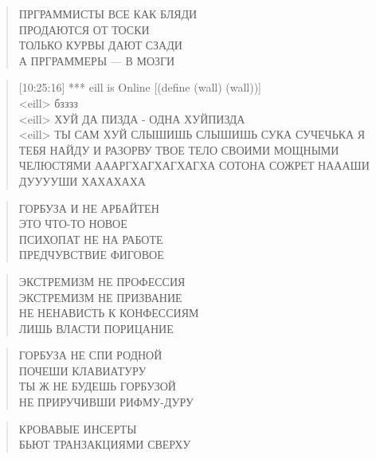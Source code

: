 \poemtitle{***}
\begin{verse}
ПРГРАММИСТЫ ВСЕ КАК БЛЯДИ\\
ПРОДАЮТСЯ ОТ ТОСКИ\\
ТОЛЬКО КУРВЫ ДАЮТ СЗАДИ\\
А ПРГРАММЕРЫ — В МОЗГИ
\end{verse}

\poemtitle{***}
\begin{verse}
[10:25:16] *** eill is Online [(define (wall) (wall))]\\
[10:25:18] <eill> бзззз\\
[10:25:27] <eill> ХУЙ ДА ПИЗДА - ОДНА ХУЙПИЗДА\\
[10:26:12] <eill> ТЫ САМ ХУЙ СЛЫШИШЬ СЛЫШИШЬ СУКА СУЧЕЧЬКА Я ТЕБЯ НАЙДУ И РАЗОРВУ ТВОЕ ТЕЛО СВОИМИ МОЩНЫМИ ЧЕЛЮСТЯМИ АААРГХАГХАГХАГХА СОТОНА СОЖРЕТ НАААШИ ДУУУУШИ ХАХАХАХА
\end{verse}

\poemtitle{***}
\begin{verse}
ГОРБУЗА И НЕ АРБАЙТЕН\\
ЭТО ЧТО-ТО НОВОЕ\\
ПСИХОПАТ НЕ НА РАБОТЕ\\
ПРЕДЧУВСТВИЕ ФИГОВОЕ
\end{verse}

\poemtitle{***}
\begin{verse}
ЭКСТРЕМИЗМ НЕ ПРОФЕССИЯ\\
ЭКСТРЕМИЗМ НЕ ПРИЗВАНИЕ\\
НЕ НЕНАВИСТЬ К КОНФЕССИЯМ\\
ЛИШЬ ВЛАСТИ ПОРИЦАНИЕ
\end{verse}

\poemtitle{***}
\begin{verse}
ГОРБУЗА НЕ СПИ РОДНОЙ\\
ПОЧЕШИ КЛАВИАТУРУ\\
ТЫ Ж НЕ БУДЕШЬ ГОРБУЗОЙ\\
НЕ ПРИРУЧИВШИ РИФМУ-ДУРУ
\end{verse}

\poemtitle{***}
\begin{verse}
КРОВАВЫЕ ИНСЕРТЫ\\
БЬЮТ ТРАНЗАКЦИЯМИ СВЕРХУ
\end{verse}

